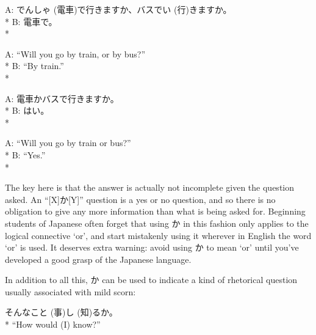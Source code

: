 \documentclass[11pt, b5paper, twoside, openright, onecolumn]{book}
\makeatletter
\newcommand*{\rubystack}[2]{{\relscale{0.5}%
  \begin{tabular}[b]{@{}c@{}}%
    {#1}\\%
   {\textscale{2}{#2}}%
  \end{tabular}}%
}
\DeclareRobustCommand*{\ruby}[2]{%
  \mbox{%
    \setlength{\parskip}{0ex}%
    \BeginAccSupp{method=pdfstringdef,ActualText={#1}}%
      \rubystack{\phantom{#2}}{#1}%
      \llap{%
        \rubystack{#2}{\phantom{#1}}%
      }%
    \EndAccSupp{}%
  }%
}
\renewcommand*{\ruby}[2]{#2 (#1)}%
\newenvironment{exampleblock}{
\setlength{\parindent}{0.6in}
\begin{minipage}[t]{\dimexpr\textwidth-\parindent}}
{\end{minipage}}
\makeatother
\begin{document}
\vspace{0.4cm}
\begin{exampleblock}
A: \ruby{電車}{でんしゃ}で行きますか、バスで\ruby{行}{い}きますか。 \\* 
B: 電車で。 \\* 
\end{exampleblock}
\vspace{0.2cm}

\begin{exampleblock}
A: “Will you go by train‚ or by bus?” \\* 
B: “By train.” \\* 
\end{exampleblock}
\vspace{0.2cm}

\begin{exampleblock}
A: 電車かバスで行きますか。 \\* 
B: はい。 \\* 
\end{exampleblock}
\vspace{0.2cm}

\begin{exampleblock}
A: “Will you go by train or bus?” \\* 
B: “Yes.” \\* 
\end{exampleblock}
\vspace{0.2cm}

The key here is that the answer is actually not incomplete given the question asked. An “[X]か[Y]” question is a yes or no question‚ and so there is no obligation to give any more information than what is being asked for. Beginning students of Japanese often forget that using か in this fashion only applies to the logical connective ‘or’‚ and start mistakenly using it wherever in English the word ‘or’ is used. It deserves extra warning: avoid using か to mean ‘or’ until you’ve developed a good grasp of the Japanese language.

In addition to all this‚ か can be used to indicate a kind of rhetorical question usually associated with mild scorn:

\vspace{0.4cm}
\begin{exampleblock}
そんな\ruby{事}{こと}\ruby{知}{し}るか。 \\* 
“How would (I) know?”\end{exampleblock}
\vspace{0.2cm}
\end{document}
